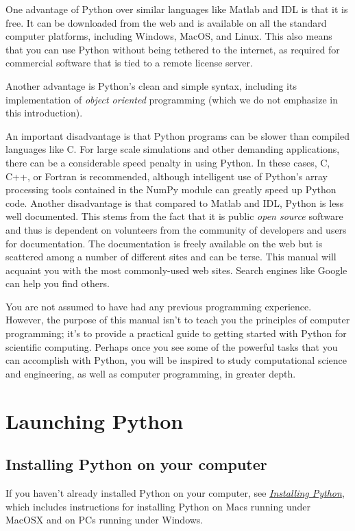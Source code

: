 \documentclass[letterpaper,10pt,english]{sphinxmanual}
\begin{document}
One advantage of Python over similar languages like Matlab and IDL is that it is free.  It can be downloaded from the web and is available on all the standard computer platforms, including Windows, MacOS, and Linux.  This also means that you can use Python without being tethered to the internet, as required for commercial software that is tied to a remote license server.

Another advantage is Python's clean and simple syntax, including its implementation of \emph{object oriented} programming (which we do not emphasize in this introduction).

An important disadvantage is that Python programs can be slower than compiled languages like C.  For large scale simulations and other demanding applications, there can be a considerable speed penalty in using Python.  In these cases, C, C++, or Fortran is recommended, although intelligent use of Python's array processing tools contained in the NumPy module can greatly speed up Python code.  Another disadvantage is that compared to Matlab and IDL, Python is less well documented.  This stems from the fact that it is public \emph{open source} software and thus is dependent on volunteers from the community of developers and users for documentation.  The documentation is freely available on the web but is scattered among a number of different sites and can be terse.  This manual will acquaint you with the most commonly-used web sites.  Search engines like Google can help you find others.

You are not assumed to have had any previous programming experience.  However, the purpose of this manual isn't to teach you the principles of computer programming; it's to provide a practical guide to getting started with Python for scientific computing.  Perhaps once you see some of the powerful tasks that you can accomplish with Python, you will be inspired to study computational science and engineering, as well as computer programming, in greater depth.


\chapter{Launching Python}
\label{chap2/chap2_basics::doc}\label{chap2/chap2_basics:chap2}\label{chap2/chap2_basics:launching-python}

\section{Installing Python on your computer}
\label{chap2/chap2_basics:installing-python-on-your-computer}
If you haven't already installed Python on your computer, see {\hyperref[apdx1/apdx1_install:apdx1]{\emph{Installing Python}}}, which includes instructions for installing Python on Macs running under MacOSX and on PCs running under  Windows.
\end{document}
